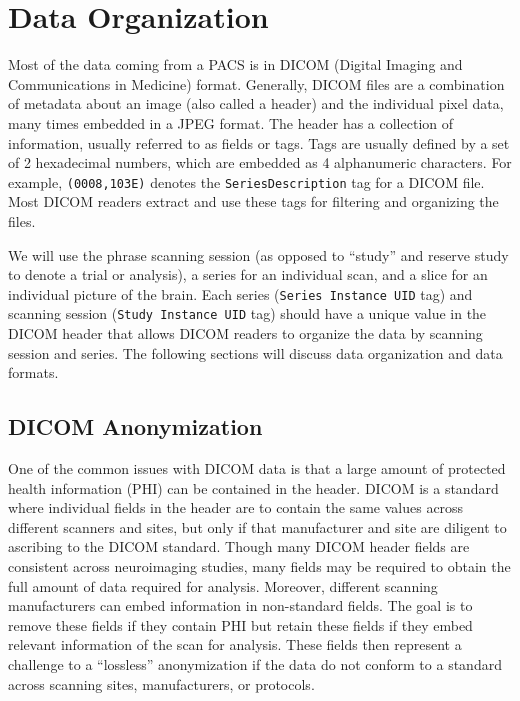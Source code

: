 \documentclass[]{elsarticle} %
\begin{document}
\hypertarget{data-organization}{%
\section{Data Organization}\label{data-organization}}

Most of the data coming from a PACS is in DICOM (Digital Imaging and
Communications in Medicine) format. Generally, DICOM files are a
combination of metadata about an image (also called a header) and the
individual pixel data, many times embedded in a JPEG format. The header
has a collection of information, usually referred to as fields or tags.
Tags are usually defined by a set of 2 hexadecimal numbers, which are
embedded as 4 alphanumeric characters. For example, \texttt{(0008,103E)}
denotes the \texttt{SeriesDescription} tag for a DICOM file. Most DICOM
readers extract and use these tags for filtering and organizing the
files.

We will use the phrase scanning session (as opposed to ``study'' and
reserve study to denote a trial or analysis), a series for an individual
scan, and a slice for an individual picture of the brain. Each series
(\texttt{Series\ Instance\ UID} tag) and scanning session
(\texttt{Study\ Instance\ UID} tag) should have a unique value in the
DICOM header that allows DICOM readers to organize the data by scanning
session and series. The following sections will discuss data
organization and data formats.

\hypertarget{dicom-anonymization}{%
\subsection{DICOM Anonymization}\label{dicom-anonymization}}

One of the common issues with DICOM data is that a large amount of
protected health information (PHI) can be contained in the header. DICOM
is a standard where individual fields in the header are to contain the
same values across different scanners and sites, but only if that
manufacturer and site are diligent to ascribing to the DICOM standard.
Though many DICOM header fields are consistent across neuroimaging
studies, many fields may be required to obtain the full amount of data
required for analysis. Moreover, different scanning manufacturers can
embed information in non-standard fields. The goal is to remove these
fields if they contain PHI but retain these fields if they embed
relevant information of the scan for analysis. These fields then
represent a challenge to a ``lossless'' anonymization if the data do not
conform to a standard across scanning sites, manufacturers, or
protocols.
\end{document}

